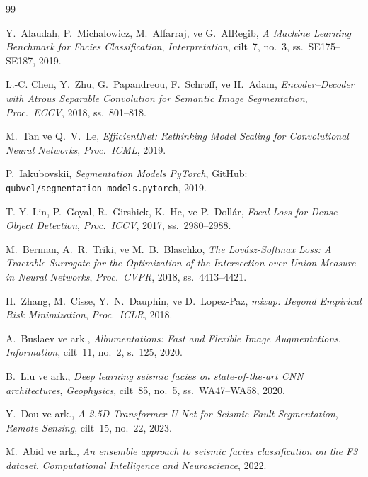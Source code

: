 \documentclass[conference,a4paper,10pt]{IEEEtran}
\begin{document}
\begin{thebibliography}{99}

Y.~Alaudah, P.~Michalowicz, M.~Alfarraj, ve G.~AlRegib,
\textit{A Machine Learning Benchmark for Facies Classification},
\textit{Interpretation}, cilt~7, no.~3, ss.~SE175--SE187, 2019.

L.-C. Chen, Y.~Zhu, G.~Papandreou, F.~Schroff, ve H.~Adam,
\textit{Encoder--Decoder with Atrous Separable Convolution for Semantic
Image Segmentation}, \textit{Proc.\ ECCV}, 2018, ss.~801--818.

M.~Tan ve Q.~V.~Le,
\textit{EfficientNet: Rethinking Model Scaling for Convolutional Neural
Networks}, \textit{Proc.\ ICML}, 2019.

P.~Iakubovskii, \textit{Segmentation Models PyTorch},
GitHub: \texttt{qubvel/segmentation\_models.pytorch}, 2019.

T.-Y. Lin, P.~Goyal, R.~Girshick, K.~He, ve P.~Doll\'ar,
\textit{Focal Loss for Dense Object Detection},
\textit{Proc.\ ICCV}, 2017, ss.~2980--2988.

M.~Berman, A.~R.~Triki, ve M.~B.~Blaschko,
\textit{The Lov\'asz-Softmax Loss: A Tractable Surrogate for the
Optimization of the Intersection-over-Union Measure in Neural Networks},
\textit{Proc.\ CVPR}, 2018, ss.~4413--4421.

H.~Zhang, M.~Cisse, Y.~N.~Dauphin, ve D.~Lopez-Paz,
\textit{mixup: Beyond Empirical Risk Minimization}, \textit{Proc.\ ICLR}, 2018.

A.~Buslaev ve ark., \textit{Albumentations: Fast and Flexible Image
Augmentations}, \textit{Information}, cilt~11, no.~2, s.~125, 2020.

B.~Liu ve ark., \textit{Deep learning seismic facies on state-of-the-art
CNN architectures}, \textit{Geophysics}, cilt~85, no.~5, ss.~WA47--WA58, 2020.

Y.~Dou ve ark., \textit{A 2.5D Transformer U-Net for Seismic Fault
Segmentation}, \textit{Remote Sensing}, cilt~15, no.~22, 2023.

M.~Abid ve ark., \textit{An ensemble approach to seismic facies
classification on the F3 dataset}, \textit{Computational Intelligence
and Neuroscience}, 2022.


\end{thebibliography}
\end{document}
